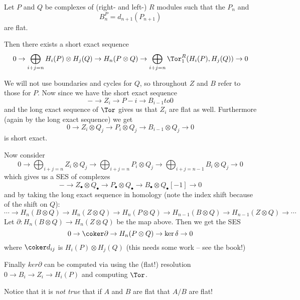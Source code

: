 \documentclass[12pt]{article}
\begin{document}
\begin{thm}
	Let $P$ and $Q$ be complexes of (right- and left-) $R$ modules such that the $P_n$ and 
	\[B_n^P=d_{n+1}(P_{n+1})\]
	are flat. 

	Then there exists a short exact sequence
	\[0\to \bigoplus_{i+j=n}H_i(P)\otimes H_j(Q)\to H_n(P\otimes Q)\to \bigoplus_{i+j=n}\Tor_1^R(H_i(P),H_j(Q))\to 0\]
\end{thm}
\begin{prf}
	We will not use boundaries and cycles for $Q$, so throughout $Z$ and $B$ refer to those for $P$. 
	Now since we have the short exact sequence
	\[-\to Z_i\to P-i\to B_{i-1}to 0\]
	and the long exact sequence of $\Tor$ gives us that $Z_i$ are flat as well. Furthermore (again by the long exact sequence)
	we get 
	\[0\to Z_i\otimes Q_j\to P_i\otimes Q_j\to B_{i-1}\otimes Q_j\to 0\]
	is short exact.

	Now consider
	\[0\to\bigoplus_{i+j=n}Z_i\otimes Q_j\to \bigoplus_{i+j=n} P_i\otimes Q_j\to\bigoplus_{i+j=n-1}B_i\otimes Q_j\to 0\]
	which gives us a SES of complexes
	\[-\to Z_\bullet\otimes Q_\bullet \to P_\bullet\otimes Q_\bullet \to B_\bullet\otimes Q_\bullet[-1]\to 0\]
	and by taking the long exact sequence in homology (note the index shift because of the shift on $Q$):
	\[\cdots\to H_n(B\otimes Q)\to H_n(Z\otimes Q)\to H_n(P\otimes Q)\to H_{n-1}(B\otimes Q)\to H_{n-1}(Z\otimes Q)\to\cdots\]
	Let $\partial:H_n(B\otimes Q)\to H_n(Z\otimes Q)$ be the map above. Then we get the SES
	\[0\to \coker\partial\to H_n(P\otimes Q)\to \ker \delta\to 0\]
	where $\coker d_{ij}$ is $H_i(P)\otimes H_j(Q)$ (this needs some work -- see the book!)

	Finally $ker\partial$ can be computed via using the (flat!) resolution $0\to B_i\to Z_i\to H_i(P)$ and computing $\Tor$.
\end{prf}
\begin{rmk}
	Notice that it is \textit{not true} that if $A$ and $B$ are flat that $A/B$ are flat! 
\end{rmk}
\end{document}
